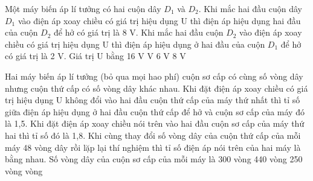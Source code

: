 
\begin{vidu} %
	Một máy biến áp lí tưởng có hai cuộn dây $D_1$ và $D_2$. Khi mắc hai đầu cuộn dây $D_1$ vào điện áp xoay chiều có giá trị hiệu dụng U thì điện áp hiệu dụng hai đầu của cuộn $D_2$ để hở có giá trị là 8 V. Khi mắc hai đầu cuộn $D_2$ vào điện áp xoay chiều có giá trị hiệu dụng U thì điện áp hiệu dụng ở hai đầu của cuộn $D_1$ để hở có giá trị là 2 V. Giá trị U bằng
	\choice
	{16 V}
	{ V}
	{6 V}
	{8 V}
\end{vidu}
\begin{vidu} %
	Hai máy biến áp lí tưởng (bỏ qua mọi hao phí) cuộn sơ cấp có cùng số vòng dây nhưng cuộn thứ cấp có số vòng dây khác nhau. Khi đặt điện áp xoay chiều có giá trị hiệu dụng U không đổi vào hai đầu cuộn thứ cấp của máy thứ nhất thì tỉ số giữa điện áp hiệu dụng ở hai đầu cuộn thứ cấp để hở và cuộn sơ cấp của máy đó là 1,5. Khi đặt điện áp xoay chiều nói trên vào hai đầu cuộn sơ cấp của máy thứ hai thì tỉ số đó là 1,8. Khi cùng thay đổi số vòng dây của cuộn thứ cấp của mỗi máy 48 vòng dây rồi lặp lại thí nghiệm thì tỉ số điện áp nói trên của hai máy là bằng nhau. Số vòng dây của cuộn sơ cấp của mỗi máy là
	\choice
	{300 vòng}
	{440 vòng}
	{250 vòng}
	{ vòng}
\end{vidu}
